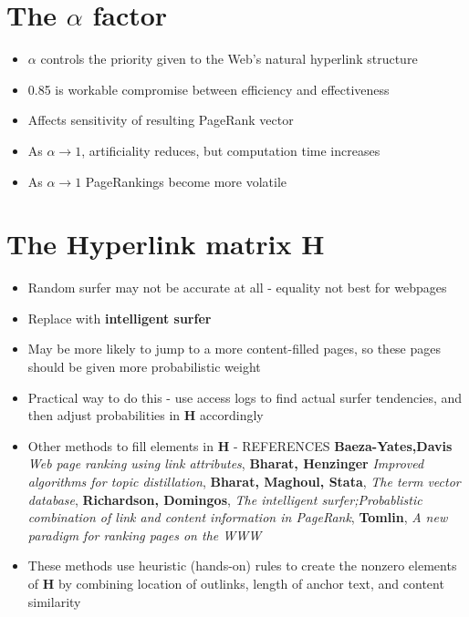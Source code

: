 \documentclass[11pt]{report}
\begin{document}
\section {The $\alpha$ factor}
\begin{itemize}
\item $\alpha$ controls the priority given to the Web's natural hyperlink structure
\item 0.85 is workable compromise between efficiency and effectiveness
\item Affects sensitivity of resulting PageRank vector
\item As $\alpha\rightarrow 1$, artificiality reduces, but computation time increases
\item As $\alpha\rightarrow 1$ PageRankings become more volatile
\end{itemize}
\section{The Hyperlink matrix \textbf{H}}
\begin{itemize}
\item Random surfer may not be accurate at all - equality not best for webpages
\item Replace with \textbf{intelligent surfer}
\item May be more likely to jump to a more content-filled pages, so these pages should be given more probabilistic weight
\item Practical way to do this - use access logs to find actual surfer tendencies, and then adjust probabilities in \textbf{H} accordingly
\item Other methods to fill elements in \textbf{H} - REFERENCES \textbf{Baeza-Yates,Davis} \textit{Web page ranking using link attributes}, \textbf{Bharat, Henzinger} \textit{Improved algorithms for topic distillation}, \textbf{Bharat, Maghoul, Stata}, \textit{The term vector database}, \textbf{Richardson, Domingos}, \textit{The intelligent surfer;Probablistic combination of link and content information in PageRank}, \textbf{Tomlin}, \textit{A new paradigm for ranking pages on the WWW}
\item These methods use heuristic (hands-on) rules to create the nonzero elements of \textbf{H} by combining location of outlinks, length of anchor text, and content similarity
\end{itemize}
\end{document}
